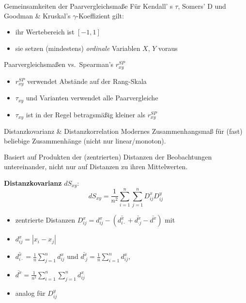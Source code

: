 \documentclass[
  10pt,
  ignorenonframetext,
]{beamer}
\providecommand{\tightlist}{%
  \setlength{\itemsep}{0pt}\setlength{\parskip}{0pt}}
\begin{document}
\begin{frame}{Gemeinsamkeiten der Paarvergleichsmaße}
\label{gemeinsamkeiten-der-paarvergleichsmauxdfe}
Für Kendall' s \(\tau\), Somers' D und Goodman \& Kruskal's
\(\gamma\)-Koeffizient gilt:

\begin{itemize}
\tightlist
\item
  ihr Wertebereich ist \([-1, 1]\)
\item
  sie setzen (mindestens) \emph{ordinale} Variablen \(X\), \(Y\) voraus
\end{itemize}
\end{frame}

\begin{frame}{Paarvergleichsmaßen vs.~Spearman's \(r^{SP}_{xy}\)}
\label{paarvergleichsmauxdfen-vs.-spearmans-rsp_xy}
\begin{itemize}
\tightlist
\item
  \(r^{SP}_{xy}\) verwendet Abstände auf der Rang-Skala
\item
  \(\tau_{xy}\) und Varianten verwendet alle Paarvergleiche
\item
  \(\tau_{xy}\) ist in der Regel betragsmäßig kleiner als
  \(r^{SP}_{xy}\)
\end{itemize}
\end{frame}

\begin{frame}{Distanzkovarianz \& Distanzkorrelation}
\label{distanzkovarianz-distanzkorrelation}
Modernes Zusammenhangsmaß für (fast) beliebige Zusammenhänge (nicht nur
linear/monoton).

Basiert auf Produkten der (zentrierten) Distanzen der Beobachtungen
untereinander, nicht nur auf Distanzen zu ihren Mittelwerten.

\textbf{Distanzkovarianz} \(dS_{xy}\):
\[dS_{xy} = \frac{1}{n^2}\sum^n_{i=1}\sum^n_{j=1}D^x_{ij}D^y_{ij}\]

\begin{itemize}
\tightlist
\item
  zentrierte Distanzen
  \(D^x_{ij} = d^x_{i j} - \left(\bar{d^x_{i \cdot}} + \bar{d^x_{\cdot j}} - \bar{d^x}\right)\)
  mit
\item
  \(d^x_{i j} = |x_i - x_j|\)
\item
  \(\bar{d^x_{i \cdot}} =  \frac{1}{n} \sum^n_{j=1} d^x_{i j}\) und
  \(\bar{d^x_{\cdot j}} =  \frac{1}{n} \sum^n_{i=1} d^x_{i j}\),
\item
  \(\bar{d^x} = \frac{1}{n^2} \sum^n_{i=1}\sum^n_{j=1} d^x_{i j}\)
\item
  analog für \(D^y_{ij}\)
\end{itemize}
\end{frame}
\end{document}
